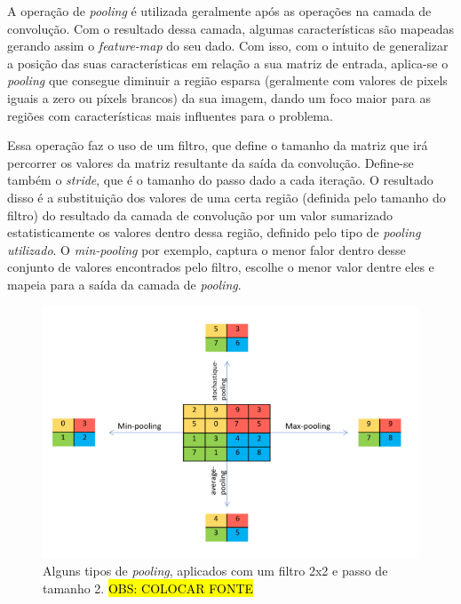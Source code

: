  \label{ssssec:pooling}
A operação de \textit{pooling} é utilizada geralmente após as operações na camada de convolução. Com o resultado dessa camada, algumas características são mapeadas gerando assim o \textit{feature-map} do seu dado. Com isso, com o intuito de generalizar a posição das suas características em relação a sua matriz de entrada, aplica-se o \textit{pooling} que consegue diminuir a região esparsa (geralmente com valores de pixels iguais a zero ou píxels brancos) da sua imagem, dando um foco maior para as regiões com características mais influentes para o problema.

Essa operação faz o uso de um filtro, que define o tamanho da matriz que irá percorrer os valores da matriz resultante da saída da convolução. Define-se também o \textit{stride}, que é o tamanho do passo dado a cada iteração. O resultado disso é a substituição dos valores de uma certa região (definida pelo tamanho do filtro) do resultado da camada de convolução por um valor sumarizado estatisticamente os valores dentro dessa região, definido pelo tipo de \textit{pooling utilizado}. O \textit{min-pooling} por exemplo, captura o menor falor dentro desse conjunto de valores encontrados pelo filtro, escolhe o menor valor dentre eles e mapeia para a saída da camada de \textit{pooling}.


\begin{figure}[H]
  \includegraphics[width=13cm, center]{figuras/pooling.png}
  \caption{Alguns tipos de \textit{pooling}, aplicados com um filtro 2x2 e passo de tamanho 2. \hl{OBS: COLOCAR FONTE}}
  \label{fig:pooling}
\end{figure}

